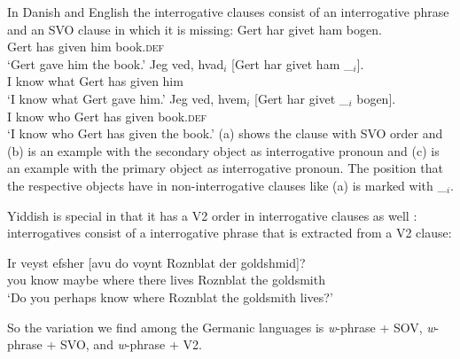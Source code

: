 In Danish and English the interrogative clauses consist of an interrogative phrase and an SVO clause
in which it is missing:
\eal
\ex 
\gll Gert har givet ham bogen.\\
     Gert has given him book.\textsc{def}\\
\glt `Gert gave him the book.'
\ex
\gll Jeg ved, hvad$_i$ [Gert har givet ham \_$_i$].\\
     I know what \spacebr{}Gert has given him\\
\glt `I know what Gert gave him.'
\ex
\gll Jeg ved, hvem$_i$ [Gert har givet \_$_i$   bogen].\\
     I know who        \spacebr{}Gert has given {} book.\textsc{def}\\
\glt `I know who Gert has given the book.'
\zl
(a) shows the clause with SVO order and (b) is an example with the secondary object as
interrogative pronoun and (c) is an example with the primary object as interrogative
pronoun. The position that the respective objects have in non-interrogative clauses like (a)
is marked with \_$_i$.

Yiddish is special in that it has a V2 order in interrogative clauses as well \citep[Sections~4.1, 4.2]{Diesing90a}: interrogatives
consist of a interrogative phrase that is extracted from a V2 clause:

\ea
\gll Ir veyst efsher [avu            do    voynt Roznblat   der goldshmid]?\footnotemark\\
     you know maybe  \spacebr{}where there lives Roznblat the goldsmith\\
\glt `Do you perhaps know where Roznblat the goldsmith lives?' 
\z
%

So the variation we find among the Germanic languages is \emph{w}-phrase + SOV, \emph{w}-phrase + SVO, and \emph{w}-phrase + V2.


